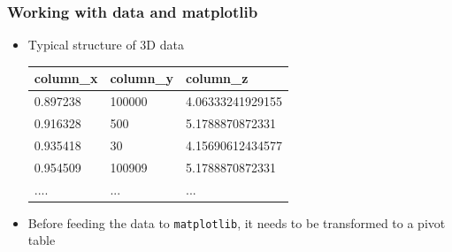 \documentclass[xcolor=table]{beamer}
\begin{document}
\begin{frame}[fragile]
\frametitle{Working with data and matplotlib}
\begin{itemize}\addtolength{\itemsep}{\baselineskip}
    \item Typical structure of 3D data 
\begin{center}
    { \ttfamily
    \begin{tabular}{|l|l|l|}\hline
        column\_x & column\_y & column\_z \\ \hline
        0.897238 & 100000 & 4.06333241929155 \\
        0.916328 & 500 & 5.1788870872331 \\
        0.935418 & 30 & 4.15690612434577 \\
        0.954509 & 100909 & 5.1788870872331 \\
        .... & ... & ... \\ \hline
    \end{tabular}
    } 
\end{center}
        \pause 
    \item Before feeding the data to \texttt{matplotlib}, it needs to be transformed to a pivot table
\end{itemize}
\end{frame}
\end{document}
